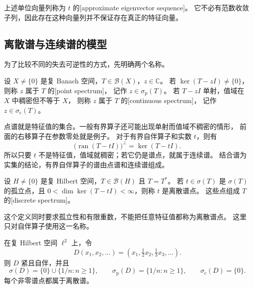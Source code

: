 上述单位向量列称为 \(t\) 的[approximate eigenvector sequence]。
它不必有范数收敛子列，因此存在这种向量列并不保证存在真正的特征向量。

\subsection{离散谱与连续谱的模型}
\label{b1:subsec:290104}

为了比较不同的失去可逆性的方式，先明确两个名称。

\begin{definition}[点谱与连续谱]
\label{b1:def:29-point-continuous-spectrum}
设 \(X\ne\{0\}\) 是复 Banach 空间，\(T\in\mathcal B(X)\)，\(z\in\mathbb C\)。
若 \(\ker(T-zI)\ne\{0\}\)，则称 \(z\) 属于 \(T\) 的[point spectrum]，
记作 \(z\in\sigma_{\mathrm p}(T)\)。
若 \(T-zI\) 单射，值域在 \(X\) 中稠密但不等于 \(X\)，
则称 \(z\) 属于 \(T\) 的[continuous spectrum]，
记作 \(z\in\sigma_{\mathrm c}(T)\)。
\end{definition}

点谱就是特征值的集合。一般有界算子还可能出现单射而值域不稠密的情形，
前面的右移算子在参数零处就是例子。
对于有界自伴算子和实数 \(t\)，则有
\[
 \bigl(\operatorname{ran}(T-tI)\bigr)^\perp=\ker(T-tI).
\]
所以只要 \(t\) 不是特征值，值域就稠密；若它仍是谱点，就属于连续谱。
结合谱为实集的结论，有界自伴算子的谱由点谱和连续谱组成。

\begin{definition}[离散谱]
\label{b1:def:29-discrete-spectrum}
设 \(H\ne\{0\}\) 是复 Hilbert 空间，\(T\in\mathcal B(H)\) 且 \(T=T^*\)。
若 \(t\in\sigma(T)\) 是 \(\sigma(T)\) 的孤立点，且
\(0<\dim\ker(T-tI)<\infty\)，则称 \(t\) 是离散谱点。
这些点组成 \(T\) 的[discrete spectrum]。
\end{definition}

这个定义同时要求孤立性和有限重数，不能把任意特征值都称为离散谱点。
这里只对自伴算子使用这一名称。

\begin{proposition}[趋于零的对角算子]
\label{b1:examp:29-compact-diagonal-spectrum}
在复 Hilbert 空间 \(\ell^2\) 上，令
\[
 D(x_1,x_2,\ldots)=(x_1,\tfrac12x_2,\tfrac13x_3,\ldots).
\]
则 \(D\) 紧且自伴，并且
\[
 \sigma(D)=\{0\}\cup\{1/n:n\geq1\},\qquad
 \sigma_{\mathrm p}(D)=\{1/n:n\geq1\},\qquad
 \sigma_{\mathrm c}(D)=\{0\}.
\]
每个非零谱点都属于离散谱。
\end{proposition}

